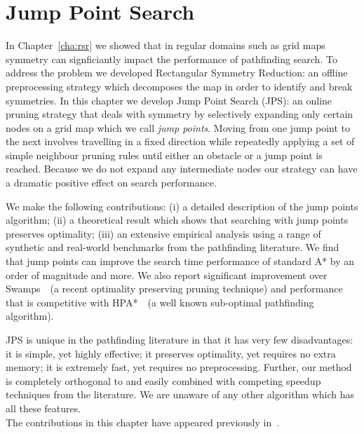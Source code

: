 \chapter{Jump Point Search}
\label{cha::jps}
In Chapter~\ref{cha:rsr} we showed that in regular domains such as grid maps
symmetry can signficiantly impact the performance of pathfinding search.
 To address the problem we developed Rectangular Symmetry Reduction:
 an offline preprocessing strategy which decomposes the map in order to 
identify and break symmetries.
 In this chapter we develop Jump Point Search 
(JPS): an online pruning strategy that
deals with symmetry by selectively expanding only certain nodes on a grid map
which we call \emph{jump points}.  
Moving from one jump point to the next
involves travelling in a fixed direction while repeatedly applying a set of
simple neighbour pruning rules until either an obstacle or a jump point is
reached.  Because we do not expand any intermediate nodes %
our strategy can have a dramatic positive effect on search performance.
\par
We make the following contributions: (i) a detailed description of the jump
points algorithm; (ii) a theoretical result which shows that searching with jump
points preserves optimality;  (iii) an extensive empirical analysis using
a range of synthetic and real-world benchmarks from the pathfinding literature.
We find that jump points can improve the search time performance of standard A* by
an order of magnitude and more.  We also report significant improvement over
Swamps~\citep{pochter10}~(a recent optimality preserving pruning technique) and
performance that is competitive with HPA*~\citep{botea04}~(a well known 
sub-optimal pathfinding algorithm).
\par
JPS is unique in the pathfinding literature in that it has very few
disadvantages: it is simple, yet highly effective; it preserves optimality, yet
requires no extra memory;  it is extremely fast, yet requires no preprocessing.
Further, our method is completely orthogonal to and easily combined with 
competing speedup techniques from the literature.
We are unaware of any other algorithm which has all these features.
\\ \newline 
The contributions in this chapter have appeared previously in~\citep{harabor11b,harabor12}.
\newpage

